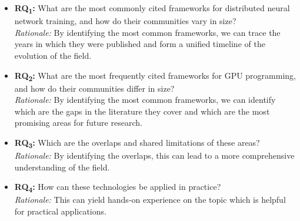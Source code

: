 
\label{sec:research_questions_refined}
\begin{itemize}
	\item \textbf{RQ\textsubscript{1}:} What are the most commonly cited
	      frameworks for distributed neural network training, and how do their communities vary in size? \\
	      \textit{Rationale:} By identifying the most common frameworks, we can trace the years in which they were published
	      and form a unified timeline of the evolution of the field.

	\item \textbf{RQ\textsubscript{2}:} What are the most frequently cited
	      frameworks for GPU programming, and how do their communities differ in size?\\
	      \textit{Rationale:} By identifying the most common frameworks, we can identify which are the gaps
	      in the literature they cover and which are the most promising areas for future research.

	\item \textbf{RQ\textsubscript{3}:} Which are the overlaps and shared limitations of these areas? \\
	      \textit{Rationale:} By identifying the overlaps, this can lead to a more comprehensive understanding of the field.

	\item \textbf{RQ\textsubscript{4}:} How can these technologies be applied in practice? \\
	      \textit{Rationale:} This can yield hands-on experience on the topic which is helpful for practical applications.

\end{itemize}

